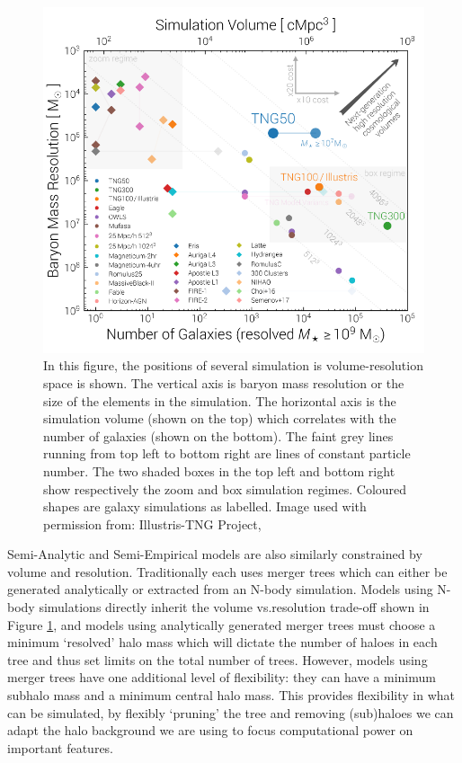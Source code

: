 \begin{figure}[h]
    \centering
    \includegraphics[width = \linewidth]{Figures/Chapter2/VolumeResolutionComparison.png}
    \caption{In this figure, the positions of several simulation is volume-resolution space is shown. The vertical axis is baryon mass resolution or the size of the elements in the simulation. The horizontal axis is the simulation volume (shown on the top) which correlates with the number of galaxies (shown on the bottom). The faint grey lines running from top left to bottom right are lines of constant particle number. The two shaded boxes in the top left and bottom right show respectively the zoom and box simulation regimes. Coloured shapes are galaxy simulations as labelled. 
    Image used with permission from: Illustris-TNG Project, \citet{Nelson2019FirstFeedback}}
    \label{fig:Vol_v_Res}
\end{figure}

Semi-Analytic and Semi-Empirical models are also similarly constrained by volume and resolution. Traditionally each uses merger trees which can either be generated analytically or extracted from an N-body simulation. Models using N-body simulations directly inherit the volume vs.resolution trade-off shown in Figure \ref{fig:Vol_v_Res}, and models using analytically generated merger trees must choose a minimum `resolved' halo mass which will dictate the number of haloes in each tree and thus set limits on the total number of trees. However, models using merger trees have one additional level of flexibility: they can have a minimum subhalo mass and a minimum central halo mass. This provides flexibility in what can be simulated, by flexibly `pruning' the tree and removing (sub)haloes we can adapt the halo background we are using to focus computational power on important features. 

